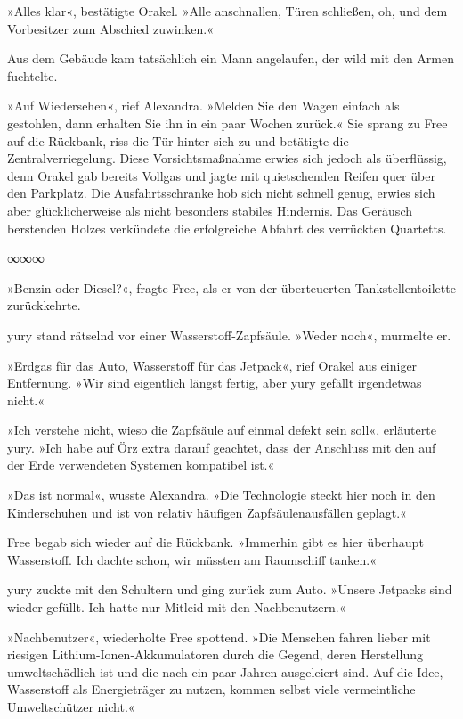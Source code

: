 »Alles klar«, bestätigte Orakel. »Alle anschnallen, Türen schließen, oh, und dem Vorbesitzer zum Abschied zuwinken.«

Aus dem Gebäude kam tatsächlich ein Mann angelaufen, der wild mit den Armen fuchtelte.

»Auf Wiedersehen«, rief Alexandra. »Melden Sie den Wagen einfach als gestohlen, dann erhalten Sie ihn in ein paar Wochen zurück.« Sie sprang zu Free auf die Rückbank, riss die Tür hinter sich zu und betätigte die Zentralverriegelung. Diese Vorsichtsmaßnahme erwies sich jedoch als überflüssig, denn Orakel gab bereits Vollgas und jagte mit quietschenden Reifen quer über den Parkplatz. Die Ausfahrtsschranke hob sich nicht schnell genug, erwies sich aber glücklicherweise als nicht besonders stabiles Hindernis. Das Geräusch berstenden Holzes verkündete die erfolgreiche Abfahrt des verrückten Quartetts.

\begin{center}
	∞∞∞
\end{center}

»Benzin oder Diesel?«, fragte Free, als er von der überteuerten Tankstellentoilette zurückkehrte.

yury stand rätselnd vor einer Wasserstoff-Zapfsäule. »Weder noch«, murmelte er.

»Erdgas für das Auto, Wasserstoff für das Jetpack«, rief Orakel aus einiger Entfernung. »Wir sind eigentlich längst fertig, aber yury gefällt irgendetwas nicht.«

»Ich verstehe nicht, wieso die Zapfsäule auf einmal defekt sein soll«, erläuterte yury. »Ich habe auf Örz extra darauf geachtet, dass der Anschluss mit den auf der Erde verwendeten Systemen kompatibel ist.«

»Das ist normal«, wusste Alexandra. »Die Technologie steckt hier noch in den Kinderschuhen und ist von relativ häufigen Zapfsäulenausfällen geplagt.«

Free begab sich wieder auf die Rückbank. »Immerhin gibt es hier überhaupt Wasserstoff. Ich dachte schon, wir müssten am Raumschiff tanken.«

yury zuckte mit den Schultern und ging zurück zum Auto. »Unsere Jetpacks sind wieder gefüllt. Ich hatte nur Mitleid mit den Nachbenutzern.«

»Nachbenutzer«, wiederholte Free spottend. »Die Menschen fahren lieber mit riesigen Lithium-Ionen-Akkumulatoren durch die Gegend, deren Herstellung umweltschädlich ist und die nach ein paar Jahren ausgeleiert sind. Auf die Idee, Wasserstoff als Energieträger zu nutzen, kommen selbst viele vermeintliche Umweltschützer nicht.«

